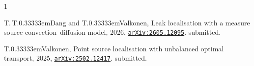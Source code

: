 \documentclass[11pt]{article}
\begin{document}
\vspace{1em}

\providecommand{\eprint}[1]{\href{http://arxiv.org/abs/#1}{arXiv:#1}}
\begin{thebibliography}{1}

T.\,T{.\nobreak\kern 0.33333em}Dang and T{.\nobreak\kern 0.33333em}Valkonen,
  Leak localisation with a measure source convection--diffusion model, 2026,
  \href{https://arxiv.org/abs/2605.12095}{\nolinkurl{arXiv:2605.12095}}.
\newblock submitted.

T{.\nobreak\kern 0.33333em}Valkonen, Point source localisation with unbalanced
  optimal transport, 2025,
  \href{https://arxiv.org/abs/2502.12417}{\nolinkurl{arXiv:2502.12417}}.
\newblock submitted.

\end{thebibliography}
\end{document}
